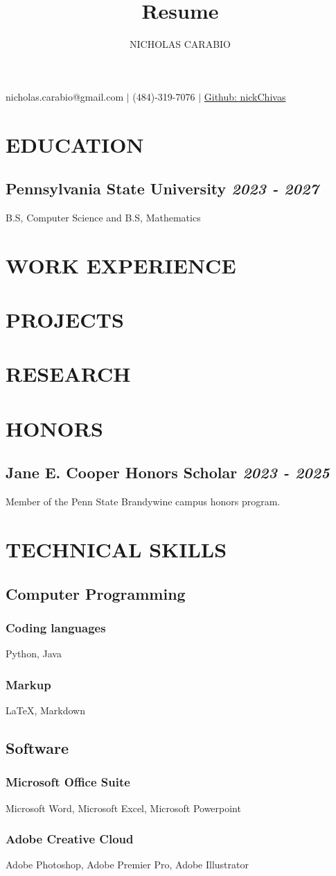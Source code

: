 \documentclass{article}
\makeatletter
\renewcommand{\maketitle}{
\begin{center}
{\huge\bfseries\theauthor}

\vspace{.25em}

nicholas.carabio@gmail.com $|$ (484)-319-7076 $|$ \href{https://github.com/nickChivas}{Github: nickChivas}
\end{center}
}
\makeatother
\begin{document}
\title{Resume}
\author{NICHOLAS CARABIO}

\maketitle

\section{EDUCATION}

\subsection{Pennsylvania State University \hfill \emph{2023 - 2027}}
B.S, Computer Science and B.S, Mathematics 

\section{WORK EXPERIENCE}

\section{PROJECTS}

\section{RESEARCH}

\section{HONORS}
\subsection{Jane E. Cooper Honors Scholar \hfill \emph{2023 - 2025}}
Member of the Penn State Brandywine campus honors program.

\section{TECHNICAL SKILLS}  
\subsection{Computer Programming}
\subsubsection{Coding languages}
Python, Java

\subsubsection{Markup}
\LaTeX , Markdown
\\
\subsection{Software}
\subsubsection{Microsoft Office Suite}
Microsoft Word, Microsoft Excel, Microsoft Powerpoint

\subsubsection{Adobe Creative Cloud}
Adobe Photoshop, Adobe Premier Pro, Adobe Illustrator
\end{document}
